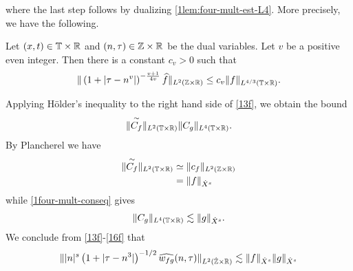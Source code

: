 %
where the last step follows by dualizing \cref{1lem:four-mult-est-L4}. More
precisely, we have the following.
\begin{corollary}
	\label{1cor:four-mult-est-L4}
	Let $(x, t) \in \mathbb{T} \times \mathbb{R} $ and $(n, \tau) \in \mathbb{Z} \times \mathbb{R}$ be 
	the dual variables. Let $v$ be a positive even integer. Then there is a 
	constant $c_v > 0$ such that
%
%
\begin{equation}
	\label{1four-mult-est-L4*}
	\begin{split}
		\| \left( 1 + | \tau - n^v | 
		\right)^{-\frac{v+1}{4v}}
		\widehat{f}\|_{L^2(\mathbb{Z} \times \mathbb{R})} \le c_v \|f \|_{L^{4/3}( \mathbb{T} \times \mathbb{R})}.
	\end{split}
\end{equation}
%
%
\end{corollary}
%
Applying H\"{o}lder's inequality to the right hand side of
\eqref{13f}, we obtain the bound
%
\begin{equation}
	\label{14f}
	\begin{split}
		\|\overset{\sim}{C_f} \|_{L^2(\mathbb{T} \times \mathbb{R})} \|C_g \|_{L^4\left( \mathbb{T} 
		\times \mathbb{R} 
		\right)}. 
	\end{split}
\end{equation}
%
By Plancherel we have
%
%
\begin{equation}
	\label{15f}
	\begin{split}
		\|\overset{\sim}{C_f} \|_{L^2(\mathbb{T} \times \mathbb{R})}
		& \simeq \|c_f\|_{L^2(\mathbb{Z} \times \mathbb{R})}
		\\
		& = \|f \|_{\dot{X}^s}
	\end{split}
\end{equation}
%
while \eqref{1four-mult-conseq} gives
%
%
\begin{equation}
	\label{16f}
	\begin{split}
		\|C_g \|_{L^4(\mathbb{T} \times \mathbb{R})} \lesssim \|g\|_{\dot{X}^s}.
	\end{split}
\end{equation}
%
%
We conclude from \eqref{13f}-\eqref{16f} that
%
%
\begin{equation*}
	\begin{split}
		\| |n|^s \left( 1 + | \tau - n^3 | \right)^{-1/2} \widehat{w_{fg}}(n, \tau) 
		 \|_{L^2(\dot{\mathbb{Z}} \times \mathbb{R})}
		 \lesssim \|f\|_{\dot{X}^s} \|g\|_{\dot{X}^s}
	\end{split}
\end{equation*}
%
%
